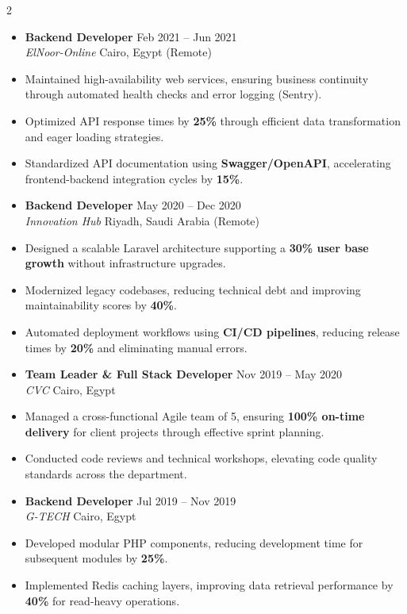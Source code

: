 \documentclass[10pt, a4paper]{article}
\newcommand{\resumeItem}[1]{
  \item\small{
    {#1 \vspace{3pt}} %
  }
}
\newcommand{\resumeSubheading}[4]{
  \vspace{10pt} %
  \item
    \textbf{#1} \hfill {\footnotesize #2} \\ 
    \textit{\small #3} \hfill {\footnotesize #4} \\
    \vspace{4pt}
}
\begin{document}
\begin{paracol}{2}
\begin{itemize}[leftmargin=0.15in, label={}]
    \resumeSubheading
      {Backend Developer}{Feb 2021 -- Jun 2021}
      {ElNoor-Online}{Cairo, Egypt (Remote)}
      \resumeItem{Maintained high-availability web services, ensuring business continuity through automated health checks and error logging (Sentry).}
      \resumeItem{Optimized API response times by \textbf{25\%} through efficient data transformation and eager loading strategies.}
      \resumeItem{Standardized API documentation using \textbf{Swagger/OpenAPI}, accelerating frontend-backend integration cycles by \textbf{15\%}.}

    \resumeSubheading
      {Backend Developer}{May 2020 -- Dec 2020}
      {Innovation Hub}{Riyadh, Saudi Arabia (Remote)}
      \resumeItem{Designed a scalable Laravel architecture supporting a \textbf{30\% user base growth} without infrastructure upgrades.}
      \resumeItem{Modernized legacy codebases, reducing technical debt and improving maintainability scores by \textbf{40\%}.}
      \resumeItem{Automated deployment workflows using \textbf{CI/CD pipelines}, reducing release times by \textbf{20\%} and eliminating manual errors.}

    \resumeSubheading
      {Team Leader \& Full Stack Developer}{Nov 2019 -- May 2020}
      {CVC}{Cairo, Egypt}
      \resumeItem{Managed a cross-functional Agile team of 5, ensuring \textbf{100\% on-time delivery} for client projects through effective sprint planning.}
      \resumeItem{Conducted code reviews and technical workshops, elevating code quality standards across the department.}

    \resumeSubheading
      {Backend Developer}{Jul 2019 -- Nov 2019}
      {G-TECH}{Cairo, Egypt}
      \resumeItem{Developed modular PHP components, reducing development time for subsequent modules by \textbf{25\%}.}
      \resumeItem{Implemented Redis caching layers, improving data retrieval performance by \textbf{40\%} for read-heavy operations.}

\end{itemize}

\switchcolumn


\end{paracol}
\end{document}
